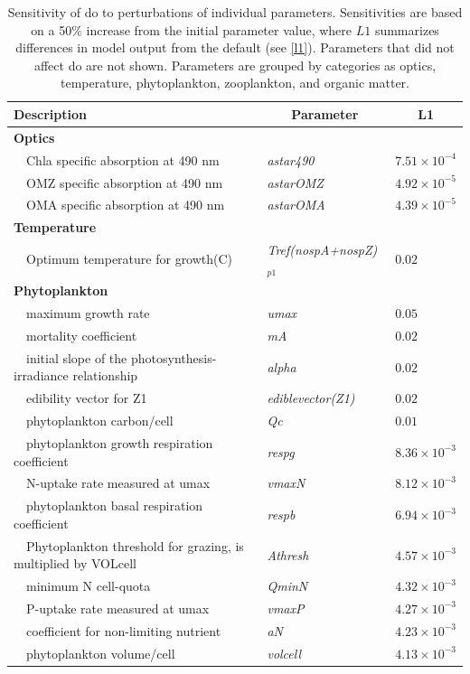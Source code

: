 \documentclass[letterpaper,12pt,oneside]{article}\usepackage[]{graphicx}\usepackage[]{color}
\begin{document}
\begin{table}[!tbp]
{\footnotesize
\caption{Sensitivity of \ac{do} to perturbations of individual parameters.  Sensitivities are based on a 50\% increase from the initial parameter value, where $L1$ summarizes differences in model output from the default (see \cref{l1}).  Parameters that did not affect \ac{do} are not shown.  Parameters are grouped by categories as optics, temperature, phytoplankton, zooplankton, and organic matter.\label{tab:dosens}} 
\begin{center}
\begin{tabular}{lll}
\hline\hline
\multicolumn{1}{l}{Description}&\multicolumn{1}{c}{Parameter}&\multicolumn{1}{c}{L1}\tabularnewline
\hline
{\bfseries Optics}&&\tabularnewline
~~Chla specific absorption at 490 nm&\textit{astar490}&$7.51\times 10^{-4}$\tabularnewline
~~OMZ specific absorption at 490 nm&\textit{astarOMZ}&$4.92\times 10^{-5}$\tabularnewline
~~OMA specific absorption at 490 nm&\textit{astarOMA}&$4.39\times 10^{-5}$\tabularnewline
\hline
{\bfseries Temperature}&&\tabularnewline
~~Optimum temperature for growth(C)&\textit{Tref(nospA+nospZ)$_{p1}$}&$0.02$\tabularnewline
\hline
{\bfseries Phytoplankton}&&\tabularnewline
~~maximum growth rate&\textit{umax}&$0.05$\tabularnewline
~~mortality coefficient&\textit{mA}&$0.02$\tabularnewline
~~initial slope of the photosynthesis-irradiance relationship&\textit{alpha}&$0.02$\tabularnewline
~~edibility vector for Z1&\textit{ediblevector(Z1)}&$0.02$\tabularnewline
~~phytoplankton carbon/cell&\textit{Qc}&$0.01$\tabularnewline
~~phytoplankton growth respiration coefficient&\textit{respg}&$8.36\times 10^{-3}$\tabularnewline
~~N-uptake rate measured at umax&\textit{vmaxN}&$8.12\times 10^{-3}$\tabularnewline
~~phytoplankton basal respiration coefficient&\textit{respb}&$6.94\times 10^{-3}$\tabularnewline
~~Phytoplankton threshold for grazing, is multiplied by VOLcell&\textit{Athresh}&$4.57\times 10^{-3}$\tabularnewline
~~minimum N cell-quota&\textit{QminN}&$4.32\times 10^{-3}$\tabularnewline
~~P-uptake rate measured at umax&\textit{vmaxP}&$4.27\times 10^{-3}$\tabularnewline
~~coefficient for non-limiting nutrient&\textit{aN}&$4.23\times 10^{-3}$\tabularnewline
~~phytoplankton volume/cell&\textit{volcell}&$4.13\times 10^{-3}$\tabularnewline

\end{tabular}
\end{center}}
\end{table}
\end{document}
